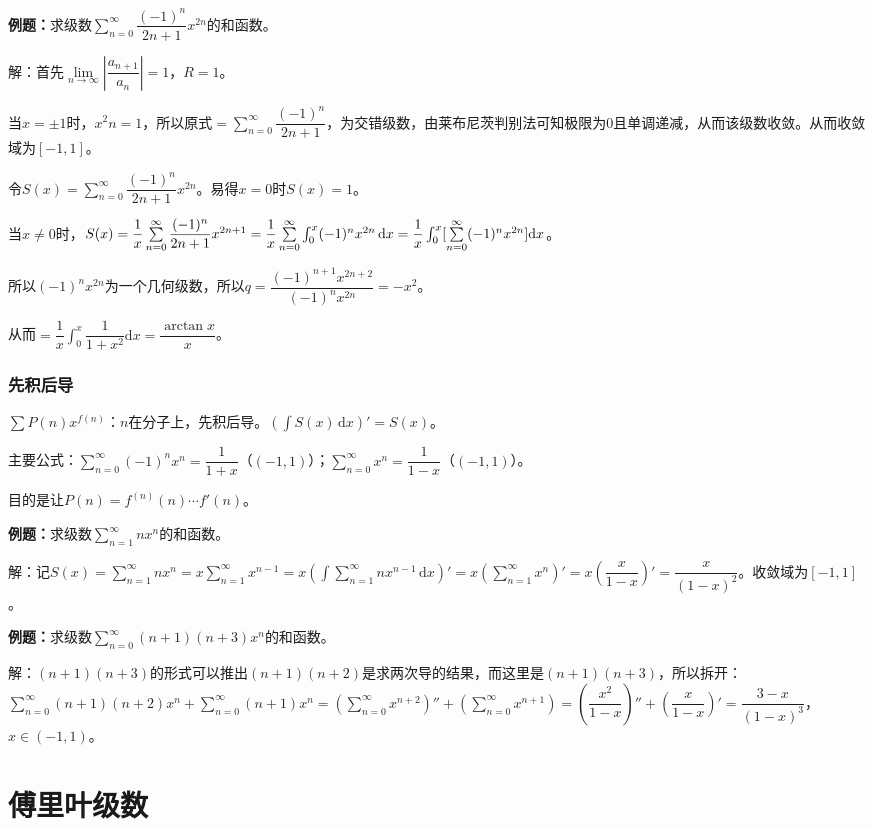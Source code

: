 \documentclass[UTF8, 12pt]{ctexart}
\begin{document}



\textbf{例题：}求级数$\sum\limits_{n=0}^\infty\dfrac{(-1)^n}{2n+1}x^{2n}$的和函数。

解：首先$\lim\limits_{n\to\infty}\left\vert\dfrac{a_{n+1}}{a_n}\right\vert=1$，$R=1$。

当$x=\pm1$时，$x^2n=1$，所以原式$=\sum\limits_{n=0}^\infty\dfrac{(-1)^n}{2n+1}$，为交错级数，由莱布尼茨判别法可知极限为0且单调递减，从而该级数收敛。从而收敛域为$[-1,1]$。

令$S(x)=\sum\limits_{n=0}^\infty\dfrac{(-1)^n}{2n+1}x^{2n}$。易得$x=0$时$S(x)=1$。

当$x\neq0$时，$S(x)=\dfrac{1}{x}\sum\limits_{n=0}^\infty\dfrac{(-1)^n}{2n+1}x^{2n+1}=\dfrac{1}{x}\sum\limits_{n=0}^\infty\int_0^x(-1)^nx^{2n}\,\textrm{d}x\\=\dfrac{1}{x}\int_0^x[\sum\limits_{n=0}^\infty(-1)^nx^{2n}]\textrm{d}x$。

所以$(-1)^nx^{2n}$为一个几何级数，所以$q=\dfrac{(-1)^{n+1}x^{2n+2}}{(-1)^nx^{2n}}=-x^2$。

从而$=\displaystyle{\dfrac{1}{x}\int_0^x\dfrac{1}{1+x^2}\textrm{d}x=\dfrac{\arctan x}{x}}$。

\subsubsection{先积后导}

$\sum P(n)x^{f(n)}$：$n$在分子上，先积后导。$(\int S(x)\,\textrm{d}x)'=S(x)$。

主要公式：$\sum\limits_{n=0}^\infty(-1)^nx^n=\dfrac{1}{1+x}$（$(-1,1)$）；$\sum\limits_{n=0}^\infty x^n=\dfrac{1}{1-x}$（$(-1,1)$）。

目的是让$P(n)=f^{(n)}(n)\cdots f'(n)$。

\textbf{例题：}求级数$\sum\limits_{n=1}^\infty nx^n$的和函数。

解：记$S(x)=\sum\limits_{n=1}^\infty nx^n=x\sum\limits_{n=1}^\infty x^{n-1}=x(\int\sum\limits_{n=1}^\infty nx^{n-1}\,\textrm{d}x)'=x(\sum\limits_{n=1}^\infty x^n)'=x\left(\dfrac{x}{1-x}\right)'=\dfrac{x}{(1-x)^2}$。收敛域为$[-1,1]$。

\textbf{例题：}求级数$\sum\limits_{n=0}^\infty(n+1)(n+3)x^n$的和函数。

解：$(n+1)(n+3)$的形式可以推出$(n+1)(n+2)$是求两次导的结果，而这里是$(n+1)(n+3)$，所以拆开：$\sum\limits_{n=0}^\infty(n+1)(n+2)x^n+\sum\limits_{n=0}^\infty(n+1)x^n=\left(\sum\limits_{n=0}^\infty x^{n+2}\right)''+\left(\sum\limits_{n=0}^\infty x^{n+1}\right)=\left(\dfrac{x^2}{1-x}\right)''+\left(\dfrac{x}{1-x}\right)'=\dfrac{3-x}{(1-x)^3}$，$x\in(-1,1)$。

\section{傅里叶级数}
\end{document}
